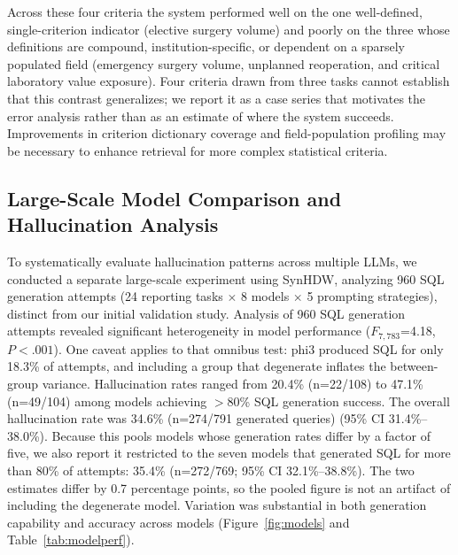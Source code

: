 \documentclass[applsci,article,submit,pdftex,oneauthor]{Definitions/mdpi}
\begin{document}
Across these four criteria the system performed well on the one well-defined, single-criterion indicator (elective surgery volume) and poorly on the three whose definitions are compound, institution-specific, or dependent on a sparsely populated field (emergency surgery volume, unplanned reoperation, and critical laboratory value exposure). Four criteria drawn from three tasks cannot establish that this contrast generalizes; we report it as a case series that motivates the error analysis rather than as an estimate of where the system succeeds. Improvements
in criterion dictionary coverage and field-population profiling may be necessary
to enhance retrieval for more complex statistical criteria.

\subsection{Large-Scale Model Comparison and Hallucination Analysis}
To systematically evaluate hallucination patterns across multiple LLMs, we
conducted a separate large-scale experiment using SynHDW, analyzing 960 SQL
generation attempts (24 reporting tasks $\times$ 8 models $\times$ 5 prompting
strategies), distinct from our initial validation study. Analysis of 960 SQL generation attempts revealed significant heterogeneity in model performance ($F_{7,783}$=4.18, $P<.001$). One caveat applies to that omnibus test: phi3 produced SQL for only 18.3\% of attempts, and including a group that degenerate inflates the between-group variance. Hallucination rates ranged from 20.4\%
(n=22/108) to 47.1\% (n=49/104) among models achieving $>$80\% SQL generation
success. The overall hallucination rate was 34.6\% (n=274/791 generated queries) (95\% CI 31.4\%--38.0\%). Because this pools models whose generation rates differ by a factor of five, we also report it restricted to the seven models that generated SQL for more than 80\% of attempts: 35.4\% (n=272/769; 95\% CI 32.1\%--38.8\%). The two estimates differ by 0.7 percentage points, so the pooled figure is not an artifact of including the degenerate model. Variation was substantial in both generation capability and accuracy across models
(Figure~\ref{fig:models} and Table~\ref{tab:modelperf}).
\end{document}
